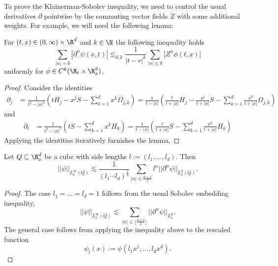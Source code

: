 To prove the Klainerman-Sobolev inequality, we need to control the usual derivatives $\partial$ pointwise by the commuting vector fields $Z$ with some additional weights. For example, we will need the following lemma:

\begin{lemma}	
	For $(t, x) \in (0, \infty) \times \R^d$ and $k \in \N$ the following inequality holds
		\[ \sum_{|\alpha| = k} |\partial^\alpha \psi (x, t)| \lesssim_{d, k} \frac{1}{|t - r|^k} \sum_{|\alpha| \leq k} |Z^\alpha \phi (t, x)| \]
	uniformly for $\phi \in C^k (\R_t \times \R_x^d)$. \label{lem:kslem1}	
\end{lemma}

\begin{proof}
	Consider the identities
		\begin{align*}
			\partial_j 
				&= \frac{1}{t^2 - |x|^2} \left( t H_j - x^j S - \sum_{k = 1}^d x^k \Omega_{j, k} \right) = \frac{1}{t - |x|} \left( \frac{t}{t + |x|} H_j - \frac{x^j}{t + |x|} S -\sum_{k = 1}^d\frac{x^k}{t + |x|} \Omega_{j, k} \right) 
		\end{align*}
	and
		\begin{align*}			
			\partial_t
				&= \frac{1}{t^2 - |x|^2} \left( t S - \sum_{k = 1}^d x^k H_k \right) = \frac{1}{t - |x|} \left( \frac{t}{t + |x|} S - \sum_{k = 1}^d \frac{x^k}{t + |x|} H_k \right)
		\end{align*}	
	Applying the identities iteratively furnishes the lemma. 
\end{proof}

\begin{lemma}
	Let $Q \subseteq \R^d_x$ be a cube with side lengths $l := (l_1, \dots, l_d)$. Then 
		\[ ||\psi||_{L^\infty_x (Q)} \lesssim \frac{1}{(l_1\cdots l_d)^\frac12} \sum_{|\alpha| \leq \frac{d + 2}{2}} l^\alpha ||\partial^\alpha \psi||_{L^2_x (Q)}. \]\label{lem:kslem2}	
\end{lemma}

\begin{proof}
	The case $l_1 = \dots = l_d = 1$ follows from the usual Sobolev embedding inequality,
		\[ ||\psi||_{L^\infty_x (Q)} \lesssim \sum_{|\alpha| \leq \lfloor\frac{d + 2}{2} \rfloor} ||\partial^\alpha \psi||_{L^2_x}. \]
	The general case follows from applying the inequality above to the rescaled function
		\[ \psi_l (x) := \psi(l_1 x^1, \dots, l_d x^d). \]
\end{proof}

